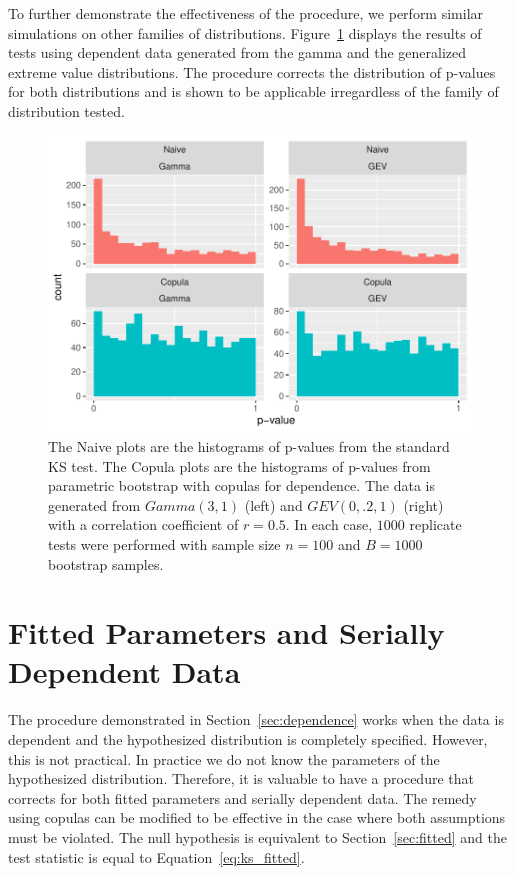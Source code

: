 \documentclass[12pt, letterpaper, titlepage]{article}
\begin{document}
To further demonstrate the effectiveness of the procedure, we perform similar 
simulations on other families of distributions. 
Figure~\ref{fig:hist_gamma_gev_D} displays the results of tests using dependent 
data generated from the gamma and the generalized extreme value distributions.
The procedure corrects the distribution of p-values for both distributions and 
is shown to be applicable irregardless of the family of distribution tested.

\begin{figure}[tbp]
  \centering
  \includegraphics{hist_gamma_gev_D}
  \caption{The Naive plots are the histograms of p-values from the standard KS 
  test. The Copula plots are the histograms of p-values from parametric 
  bootstrap with copulas for dependence. The data is generated from $Gamma(3, 
  1)$ (left) and $GEV(0, .2, 1)$ (right) with a correlation coefficient of $r = 
  0.5$. In each case, $1000$ replicate tests were performed with sample size $n 
  = 100$ and $B = 1000$ bootstrap samples.}
  \label{fig:hist_gamma_gev_D}
\end{figure}

\section{Fitted Parameters and Serially Dependent Data}
\label{sec:fittedwithdependence}

The procedure demonstrated in Section~\ref{sec:dependence} works when the data 
is dependent and the hypothesized distribution is completely specified. However,
this is not practical. In practice we do not know the parameters of the 
hypothesized distribution. Therefore, it is valuable to have a procedure that
corrects for both fitted parameters and serially dependent data. The remedy 
using copulas can be modified to be effective in the case where both assumptions
must be violated. The null hypothesis is equivalent to Section~\ref{sec:fitted} 
and the test statistic is equal to Equation~\ref{eq:ks_fitted}.
\end{document}
